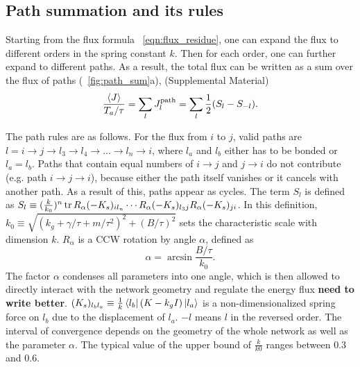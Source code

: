 \documentclass[
 preprint,
 preprintnumbers,
 amsmath,amssymb,
 aps,
 pre,
 longbibliography,
 superscriptaddress,
 10pt, twocolumn
]{revtex4-1}
\begin{document}

\subsection{Path summation and its rules}
Starting from the flux formula \eqnname~\eqref{eqn:flux_residue}, one can expand the flux to different orders in the spring constant $k$. Then for each order, one can further expand to different paths.
As a result, the total flux can be written as a sum over the flux of paths (\figurename~\ref{fig:path_sum}a), (Supplemental Material)
\begin{equation} \label{eqn:flux_path}
    \frac{\expval{J}}{T_a/\tau} = \sum_l J^\text{path}_l = \sum_l \frac{1}{2}(S_l - S_{-l}).
\end{equation}

The path rules are as follows.
For the flux from $i$ to $j$, valid paths are $l=i\rightarrow j\rightarrow l_3\rightarrow l_4\rightarrow \dots \rightarrow l_n\rightarrow i$, where $l_a$ and $l_b$ either has to be bonded or $l_a=l_b$. Paths that contain equal numbers of $i\rightarrow j$ and $j\rightarrow i$ do not contribute (e.g. path $i\rightarrow j\rightarrow i$), because either the path itself vanishes or it cancels with another path. As a result of this, paths appear as cycles.
The term $S_l$ is defined as $S_l \equiv (\frac{k}{k_0})^n \tr R_\alpha (-K_s)_{i l_n} \cdots R_\alpha (-K_s)_{l_3j} R_\alpha (-K_s)_{ji}$.
In this definition, $k_0\equiv \sqrt{(k_g+\gamma/\tau+m/\tau^2)^2 + (B/\tau)^2}$ sets the characteristic scale with dimension $k$. $R_\alpha$ is a CCW rotation by angle $\alpha$, defined as
\begin{equation} \label{eqn:path_alpha_def}
    \alpha = \arcsin{\frac{B/\tau}{k_0}}.
\end{equation}
The factor $\alpha$ condenses all parameters into one angle, which is then allowed to directly interact with the network geometry and regulate the energy flux {\bf need to write better}. $(K_s)_{l_b l_a} \equiv \frac{1}{k}\bra{l_b}(K-k_gI)\ket{l_a}$ is a non-dimensionalized spring force on $l_b$ due to the displacement of $l_a$.
$-l$ means $l$ in the reversed order.
The interval of convergence depends on the geometry of the whole network as well as the parameter $\alpha$. The typical value of the upper bound of $\frac{k}{k0}$ ranges between $0.3$ and $0.6$.
\end{document}
